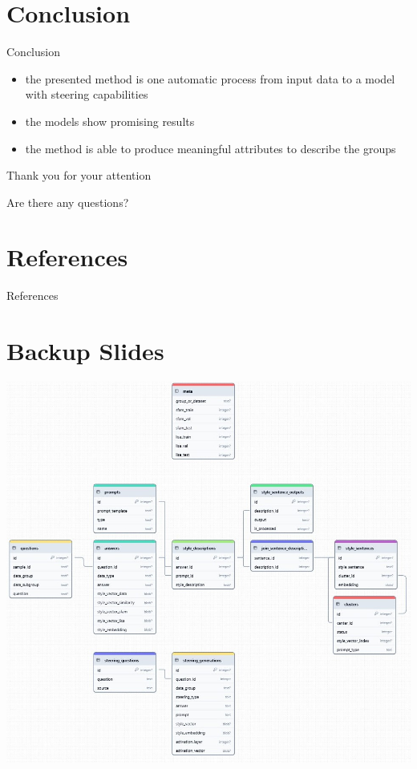 \documentclass[]{beamer}
\begin{document}
\section{Conclusion}
\begin{frame}{Conclusion}
  \begin{itemize}
    \item the presented method is one automatic process from input data to a model with steering capabilities
    \item the models show promising results
    \item the method is able to produce meaningful attributes to describe the groups
  \end{itemize}
\end{frame}


\begin{frame}[c]
  \centering \Large
  Thank you for your attention

  \vspace{0.5em} \large
  Are there any questions?
\end{frame}

\section*{References}
\begin{frame}[allowframebreaks]{References}
  \printbibliography
\end{frame}


\section*{Backup Slides}
\begin{frame}[plain]
  \includegraphics[width=\linewidth]{img/sqlite-db.jpeg}
\end{frame}
\end{document}
